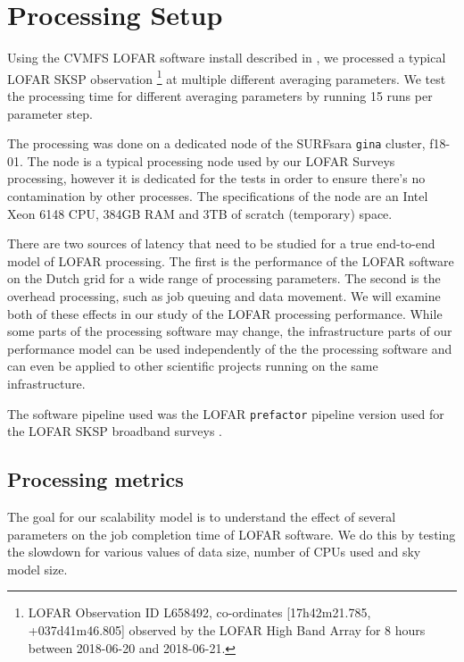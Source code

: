 \section{Processing Setup }\label{sec:methods}
Using the CVMFS LOFAR software install described in \citep{mechev17}, we processed a typical LOFAR SKSP observation \footnote{LOFAR Observation ID L658492, co-ordinates [17h42m21.785, +037d41m46.805] observed by the LOFAR High Band Array for 8 hours between 2018-06-20 and 2018-06-21. } at multiple different averaging parameters. We test the processing time for different averaging parameters by running 15 runs per parameter step. 

The processing was done on a dedicated node of the SURFsara \texttt{gina} cluster, f18-01. The node is a typical processing node used by our LOFAR Surveys processing, however it is dedicated for the tests in order to ensure there's no contamination by other processes. The specifications of the node are an Intel Xeon 6148 CPU, 384GB RAM and 3TB of scratch (temporary) space. 

There are two sources of latency that need to be studied for a true end-to-end model of LOFAR processing. The first is the performance of the LOFAR software on the Dutch grid for a wide range of processing parameters. The second is the overhead processing, such as job queuing and data movement. We will examine both of these effects in our study of the LOFAR processing performance. While some parts of the processing software may change, the infrastructure parts of our performance model can be used independently of the the processing software and can even be applied to other scientific projects running on the same infrastructure. 

The software pipeline used was the LOFAR \texttt{prefactor} pipeline version used for the LOFAR SKSP broadband surveys \citep{prefactor_zenodo}. 

\subsection{Processing metrics}
The goal for our scalability model is to understand the effect of several parameters on the job completion time of LOFAR software. We do this by testing the slowdown for various values of data size, number of CPUs used and sky model size. 

